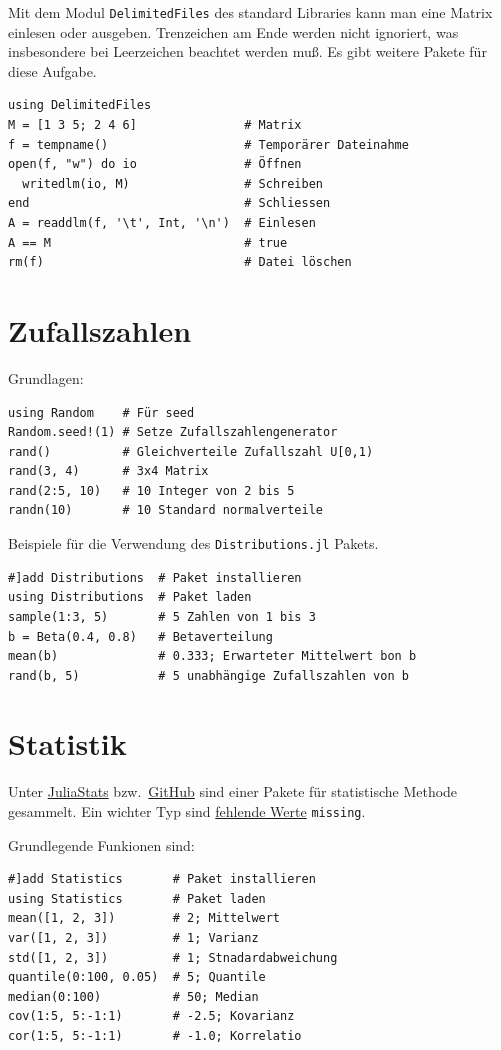 \documentclass[10pt,twocolumn]{scrartcl}
\begin{document}
Mit dem Modul \lstinline|DelimitedFiles| des standard Libraries kann man eine
Matrix einlesen oder ausgeben. Trenzeichen am Ende werden nicht ignoriert, was
insbesondere bei Leerzeichen beachtet werden muß. Es gibt weitere Pakete für
diese Aufgabe.

\begin{lstlisting}
using DelimitedFiles
M = [1 3 5; 2 4 6]               # Matrix
f = tempname()                   # Temporärer Dateinahme
open(f, "w") do io               # Öffnen
  writedlm(io, M)                # Schreiben
end                              # Schliessen
A = readdlm(f, '\t', Int, '\n')  # Einlesen
A == M                           # true
rm(f)                            # Datei löschen
\end{lstlisting}

\section{Zufallszahlen}
\label{sec:zufallszahlen}

Grundlagen:
\begin{lstlisting}
using Random    # Für seed
Random.seed!(1) # Setze Zufallszahlengenerator
rand()          # Gleichverteile Zufallszahl U[0,1)
rand(3, 4)      # 3x4 Matrix
rand(2:5, 10)   # 10 Integer von 2 bis 5
randn(10)       # 10 Standard normalverteile
\end{lstlisting}

Beispiele für die Verwendung des \lstinline|Distributions.jl| Pakets.
\begin{lstlisting}
#]add Distributions  # Paket installieren
using Distributions  # Paket laden
sample(1:3, 5)       # 5 Zahlen von 1 bis 3
b = Beta(0.4, 0.8)   # Betaverteilung
mean(b)              # 0.333; Erwarteter Mittelwert bon b
rand(b, 5)           # 5 unabhängige Zufallszahlen von b
\end{lstlisting}

\section{Statistik}
\label{sec:statistik}

Unter \href{https://juliastats.org/}{JuliaStats} bzw.\ \href{https://github.com/JuliaStats/}{GitHub} sind einer Pakete für statistische Methode gesammelt.
Ein wichter Typ sind \hyperref[sec:weitereTypen]{fehlende Werte} \lstinline|missing|.

Grundlegende Funkionen sind:
\begin{lstlisting}
#]add Statistics       # Paket installieren
using Statistics       # Paket laden
mean([1, 2, 3])        # 2; Mittelwert
var([1, 2, 3])         # 1; Varianz
std([1, 2, 3])         # 1; Stnadardabweichung
quantile(0:100, 0.05)  # 5; Quantile
median(0:100)          # 50; Median
cov(1:5, 5:-1:1)       # -2.5; Kovarianz
cor(1:5, 5:-1:1)       # -1.0; Korrelatio
\end{lstlisting}
\end{document}
